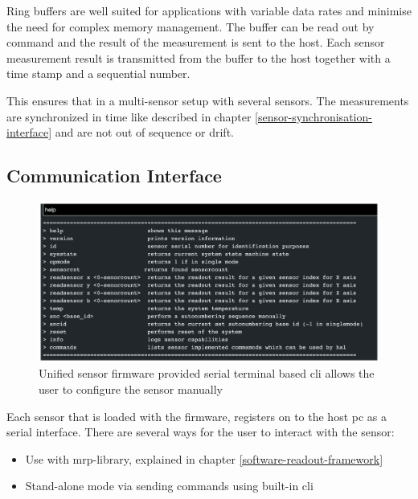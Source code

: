 Ring buffers are well suited for applications with variable data rates
and minimise the need for complex memory management. The buffer can be
read out by command and the result of the measurement is sent to the
host. Each sensor measurement result is transmitted from the buffer to
the host together with a time stamp and a sequential number.

This ensures that in a multi-sensor setup with several sensors. The
measurements are synchronized in time like described in chapter
\ref{sensor-synchronisation-interface} and are not out of sequence or
drift.

\hypertarget{communication-interface}{%
\subsection{Communication Interface}\label{communication-interface}}

\begin{figure}
\centering
\includegraphics{./generated_images/border_Unified_sensor_firmware_provided_serial_terminal_based_(+cli)_allows_the_user_to_configure_the_sensor_manually.png}
\caption{Unified sensor firmware provided serial terminal based
\gls{cli} allows the user to configure the sensor manually
\label{Unified_sensor_firmware_provided_serial_terminal_based_(+cli)_allows_the_user_to_configure_the_sensor_manually.png}}
\end{figure}

Each sensor that is loaded with the firmware, registers on to the host
\gls{pc} as a serial interface. There are several ways for the user to
interact with the sensor:

\begin{itemize}
\tightlist
\item
  Use with \gls{mrp}-library, explained in chapter
  \ref{software-readout-framework}
\item
  Stand-alone mode via sending commands using built-in \gls{cli}
\end{itemize}

